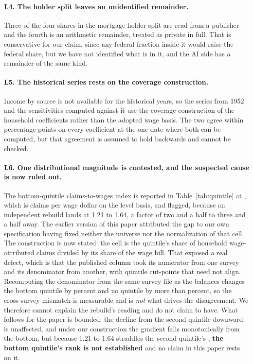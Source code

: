 \paragraph{L4. The holder split leaves an unidentified remainder.} Three of the four shares in
the mortgage holder split are read from a publisher and the fourth is an arithmetic remainder,
treated as private in full. That is conservative for our claim, since any federal fraction inside
it would raise the federal share, but we have not identified what is in it, and the AI side has a
remainder of the same kind.

\paragraph{L5. The historical series rests on the coverage construction.} Income by source is not
available for the historical years, so the series from 1952 and the sensitivities computed
against it use the coverage construction of the household coefficients rather than the adopted
wage basis. The two agree within  percentage points on every
coefficient at the one date where both can be computed, but that agreement is assumed to hold
backwards and cannot be checked.

\paragraph{L6. One distributional magnitude is contested, and the suspected cause is now ruled
out.} The bottom-quintile claims-to-wages index is reported in
Table~\ref{tab:quintile} at , which is  claims per wage
dollar on the level basis, and flagged, because an independent rebuild
lands at 1.21 to 1.64, a factor of two and a half to three and a half away. The earlier version
of this paper attributed the gap to our own specification having fixed neither the universe nor
the normalization of that cell. The construction is now stated: the cell is the quintile's share
of household wage-attributed claims divided by its share of the wage bill. That exposed a real
defect, which is that the published column took its numerator from one survey and its
denominator from another, with quintile cut-points that need not align. Recomputing the
denominator from the same survey file as the balances changes the bottom quintile by
 percent and no quintile by more than 
percent, so the cross-survey mismatch is measurable and is \emph{not} what drives the
disagreement. We therefore cannot explain the rebuild's reading and do not claim to have. What
follows for the paper is bounded: the decline from the second quintile downward is unaffected,
and under our construction the gradient falls monotonically from the bottom, but because 1.21 to
1.64 straddles the second quintile's , \textbf{the bottom quintile's rank
is not established} and no claim in this paper rests on it.

